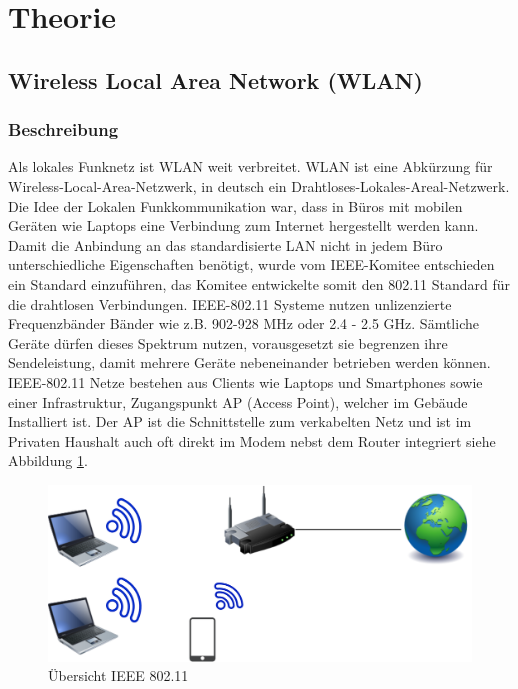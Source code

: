 \section{Theorie}
\subsection{Wireless Local Area Network (WLAN)} 
\subsubsection{Beschreibung}
Als lokales Funknetz ist WLAN weit verbreitet. WLAN ist eine Abkürzung für Wireless-Local-Area-Netzwerk, in deutsch ein Drahtloses-Lokales-Areal-Netzwerk. Die Idee der Lokalen Funkkommunikation war, dass in Büros mit mobilen Geräten wie Laptops eine Verbindung zum Internet hergestellt werden kann. Damit die Anbindung an das standardisierte LAN nicht in jedem Büro unterschiedliche Eigenschaften benötigt, wurde vom IEEE-Komitee entschieden ein Standard einzuführen, das Komitee entwickelte somit den 802.11 Standard für die drahtlosen Verbindungen. IEEE-802.11 Systeme nutzen unlizenzierte Frequenzbänder Bänder wie z.B. 902-928 MHz oder 2.4 - 2.5 GHz. Sämtliche Geräte dürfen dieses Spektrum nutzen, vorausgesetzt sie begrenzen ihre Sendeleistung, damit mehrere Geräte nebeneinander betrieben werden können. IEEE-802.11 Netze bestehen aus Clients wie Laptops und Smartphones sowie einer Infrastruktur, Zugangspunkt AP (Access Point), welcher im Gebäude Installiert ist. Der AP ist die Schnittstelle zum verkabelten Netz und ist im Privaten Haushalt auch oft direkt im Modem nebst dem Router integriert siehe Abbildung \ref{pic: IEEE802.11}.


 \begin{figure}[H]
	\centering
	\includegraphics[width=\textwidth]{graphics/IEEE80211.png}
	\caption{Übersicht IEEE 802.11} 	
	\label{pic: IEEE802.11}
\end{figure} 
